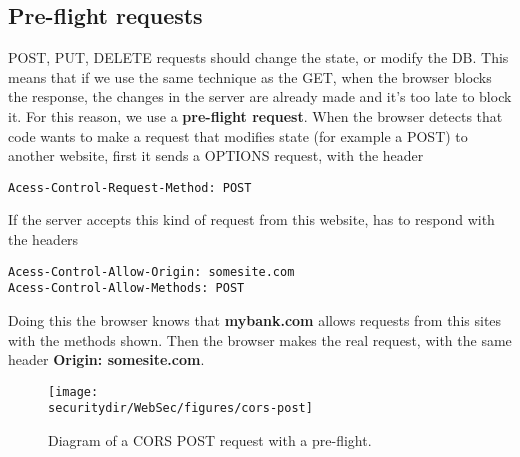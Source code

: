 \subsection{Pre-flight requests}
POST, PUT, DELETE requests should change the state, or modify the DB. This means that if we use the same technique as the GET, when the browser blocks the response, the changes in the server are already made and it's too late to block it. For this reason, we use a \textbf{pre-flight request}. When the browser detects that code wants to make a request that modifies state (for example a POST) to another website, first it sends a OPTIONS request, with the header \begin{lstlisting}[style=verbs]
Acess-Control-Request-Method: POST
\end{lstlisting}
If the server accepts this kind of request from this website, has to respond with the headers 
\begin{lstlisting}[style=verbs]
Acess-Control-Allow-Origin: somesite.com
Acess-Control-Allow-Methods: POST
\end{lstlisting}
Doing this the browser knows that \textbf{mybank.com} allows requests from this sites with the methods shown. Then the browser makes the real request, with the same header \textbf{Origin: somesite.com}. 


\begin{figure}[htb]
	\begin{centering}
		\texttt{[image: \\securitydir/WebSec/figures/cors-post]}
		\par\end{centering}
	\caption{\label{fig:ecb} Diagram of a CORS POST request with a pre-flight.}
\end{figure}